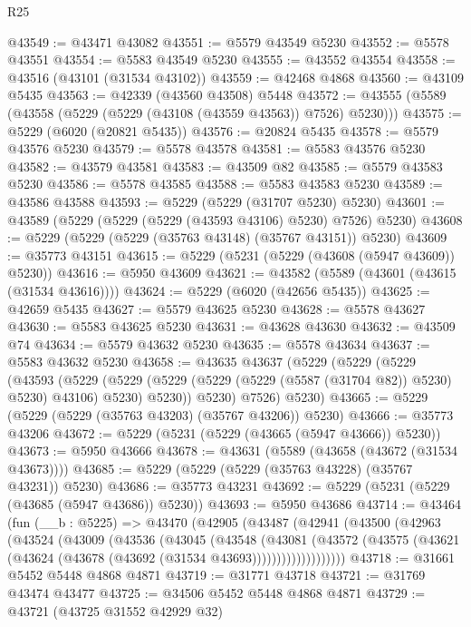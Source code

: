 \begin{lexlean}{R25}
\begin{coremodule}
@43549 := @43471 @43082
@43551 := @5579 @43549 @5230
@43552 := @5578 @43551
@43554 := @5583 @43549 @5230
@43555 := @43552 @43554
@43558 := @43516 (@43101 (@31534 @43102))
@43559 := @42468 @4868
@43560 := @43109 @5435
@43563 := @42339 (@43560 @43508) @5448
@43572 := @43555 (@5589 (@43558 (@5229 (@5229 (@43108 (@43559 @43563)) @7526) @5230)))
@43575 := @5229 (@6020 (@20821 @5435))
@43576 := @20824 @5435
@43578 := @5579 @43576 @5230
@43579 := @5578 @43578
@43581 := @5583 @43576 @5230
@43582 := @43579 @43581
@43583 := @43509 @82
@43585 := @5579 @43583 @5230
@43586 := @5578 @43585
@43588 := @5583 @43583 @5230
@43589 := @43586 @43588
@43593 := @5229 (@5229 (@31707 @5230) @5230)
@43601 := @43589 (@5229 (@5229 (@5229 (@43593 @43106) @5230) @7526) @5230)
@43608 := @5229 (@5229 (@5229 (@35763 @43148) (@35767 @43151)) @5230)
@43609 := @35773 @43151
@43615 := @5229 (@5231 (@5229 (@43608 (@5947 @43609)) @5230))
@43616 := @5950 @43609
@43621 := @43582 (@5589 (@43601 (@43615 (@31534 @43616))))
@43624 := @5229 (@6020 (@42656 @5435))
@43625 := @42659 @5435
@43627 := @5579 @43625 @5230
@43628 := @5578 @43627
@43630 := @5583 @43625 @5230
@43631 := @43628 @43630
@43632 := @43509 @74
@43634 := @5579 @43632 @5230
@43635 := @5578 @43634
@43637 := @5583 @43632 @5230
@43658 := @43635
    @43637
    (@5229
      (@5229
        (@5229
          (@43593
            (@5229
              (@5229 (@5229 (@5229 (@5229 (@5587 (@31704 @82)) @5230) @5230) @43106) @5230)
              @5230))
          @5230)
        @7526)
      @5230)
@43665 := @5229 (@5229 (@5229 (@35763 @43203) (@35767 @43206)) @5230)
@43666 := @35773 @43206
@43672 := @5229 (@5231 (@5229 (@43665 (@5947 @43666)) @5230))
@43673 := @5950 @43666
@43678 := @43631 (@5589 (@43658 (@43672 (@31534 @43673))))
@43685 := @5229 (@5229 (@5229 (@35763 @43228) (@35767 @43231)) @5230)
@43686 := @35773 @43231
@43692 := @5229 (@5231 (@5229 (@43685 (@5947 @43686)) @5230))
@43693 := @5950 @43686
@43714 := @43464
    (fun (__b : @5225) =>
    @43470
      (@42905
        (@43487
          (@42941
            (@43500
              (@42963
                (@43524
                  (@43009
                    (@43536
                      (@43045
                        (@43548
                          (@43081
                            (@43572
                              (@43575
                                (@43621 (@43624 (@43678 (@43692 (@31534 @43693)))))))))))))))))))
@43718 := @31661 @5452 @5448 @4868 @4871
@43719 := @31771 @43718
@43721 := @31769 @43474 @43477
@43725 := @34506 @5452 @5448 @4868 @4871
@43729 := @43721 (@43725 @31552 @42929 @32)

\end{coremodule}
\end{lexlean}
